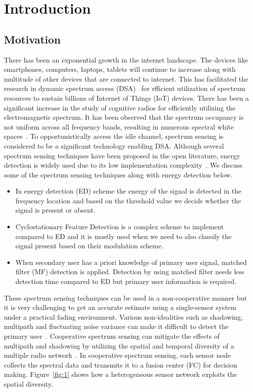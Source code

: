 \chapter{Introduction}
\label{ch:introduction}
\section{Motivation}
There has been an exponential growth in the internet landscape. The devices like smartphones, computers, laptops, tablets will continue to increase along with multitude of other devices that are connected to internet. This has facilitated the research in dynamic spectrum access (DSA)~\cite{arhtn2,arhtn3} for efficient utilization of spectrum resources to sustain billions of Internet of Things (IoT) devices. There has been a significant increase in the study of cognitive radios for efficiently utilizing the electromagnetic spectrum. It has been observed that the spectrum occupancy is not uniform across all frequency bands, resulting in numerous spectral white spaces~\cite{bookhtn1}. To opportunistically access the idle channel, spectrum sensing is considered to be a significant technology enabling DSA. Although several spectrum sensing techniques have been proposed in the open literature, energy detection is widely used due to its low implementation complexity~\cite{arhtn4}. We discuss some of the spectrum sensing techniques along with energy detection below.
\begin{itemize}
\item In energy detection (ED) scheme the energy of the signal is detected in the frequency location and based on the threshold value we decide whether the signal is present or absent.

\item Cyclostationary Feature Detection is a complex scheme to implement compared to ED and it is mostly used when we need to also classify the signal present based on their modulation scheme.

\item When secondary user has a priori knowledge of primary user signal, matched  filter (MF)  detection  is  applied. Detection by using matched filter needs less detection time compared to ED but primary user information is required.
\end{itemize}

These spectrum sensing techniques can be used in a non-cooperative manner but it is very challenging to get an accurate estimate using a single-sensor system under a practical fading environment. Various non-idealities such as shadowing, multipath and fluctuating noise variance can make it difficult to detect the primary user~\cite{inphtn5,inphtn6}. Cooperative spectrum sensing can mitigate the effects of multipath and shadowing by utilizing the spatial and temporal diversity of a multiple radio network~\cite{inphtn7,inphtn8}. In cooperative spectrum sensing, each sensor node collects the spectral data and transmits it to a fusion center (FC) for decision making. Figure~\ref{fig:1} shows how a heterogeneous sensor network exploits the spatial diversity. 


